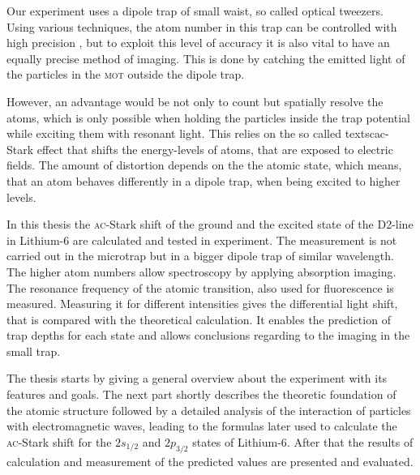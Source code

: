 Our experiment uses a dipole trap of small waist, so called optical tweezers. Using various techniques, the atom number in this trap can be controlled with high precision \cite{preparation}, but to exploit this level of accuracy it is also vital to have an equally precise method of imaging. This is done by catching the emitted light of the particles in the \textsc{mot} outside the dipole trap.

However, an advantage would be not only to count but spatially resolve the atoms, which is only possible when holding the particles inside the trap potential while exciting them with resonant light. This relies on the so called textsc{ac}-Stark effect that shifts the energy-levels of atoms, that are exposed to electric fields. The amount of distortion depends on the the atomic state, which means, that an atom behaves differently in a dipole trap, when being excited to higher levels.

In this thesis the \textsc{ac}-Stark shift of the ground and the excited state of the D2-line in Lithium-6 are calculated and tested in experiment. The measurement is not carried out in the microtrap but in a bigger dipole trap of similar wavelength. The higher atom numbers allow spectroscopy by applying absorption imaging. The resonance frequency of the atomic transition, also used for fluorescence is measured. Measuring it for different intensities gives the differential light shift, that is compared with the theoretical calculation. It enables the prediction of trap depths for each state and allows conclusions regarding to the imaging in the small trap. 

The thesis starts by giving a general overview about the experiment with its features and goals. The next part shortly describes the theoretic foundation of the atomic structure followed by a detailed analysis of the interaction of particles with electromagnetic waves, leading to the formulas later used to calculate the \textsc{ac}-Stark shift for the $2s_{1/2}$ and $2p_{3/2}$ states of Lithium-6. After that the results of calculation and measurement of the predicted values are presented and evaluated.


